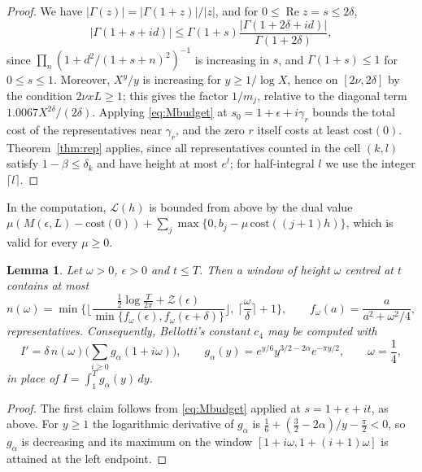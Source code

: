 \documentclass[11pt]{amsart}
\numberwithin{equation}{section}
\newtheorem{lemma}[theorem]{Lemma}
\theoremstyle{definition}
\theoremstyle{remark}
\newcommand{\Rp}{\operatorname{Re}}
\begin{document}
\begin{proof}
We have $|\Gamma(z)| = |\Gamma(1 + z)|/|z|$, and for $0 \leq \Rp z = s \leq 2\delta$,
\[
|\Gamma(1 + s + id)| \leq \Gamma(1 + s)\frac{|\Gamma(1 + 2\delta + id)|}{\Gamma(1 + 2\delta)},
\]
since $\prod_n(1 + d^2/(1 + s + n)^2)^{-1}$ is increasing in $s$, and $\Gamma(1 + s) \leq 1$ for $0 \leq s \leq 1$.
Moreover, $X^y/y$ is increasing for $y \geq 1/\log X$, hence on $[2\nu, 2\delta]$ by the condition $2\nu xL \geq 1$; this gives the factor $1/m_j$, relative to the diagonal term $1.0067X^{2\delta}/(2\delta)$.
Applying \eqref{eq:Mbudget} at $s_0 = 1 + \epsilon + i\gamma_r$ bounds the total cost of the representatives near $\gamma_r$, and the zero $r$ itself costs at least $\mathrm{cost}(0)$.
Theorem~\ref{thm:rep} applies, since all representatives counted in the cell $(k, l)$ satisfy $1 - \beta \leq \delta_k$ and have height at most $e^l$; for half-integral $l$ we use the integer $\lceil l\rceil$.
\end{proof}

In the computation, $\mathcal L(h)$ is bounded from above by the dual value $\mu(M(\epsilon, L) - \mathrm{cost}(0)) + \sum_j\max\{0, b_j - \mu\,\mathrm{cost}((j+1)h)\}$, which is valid for every $\mu \geq 0$.

\begin{lemma}\label{lem:crowd}
Let $\omega > 0$, $\epsilon > 0$ and $t \leq T$.
Then a window of height $\omega$ centred at $t$ contains at most
\[
n(\omega) = \min\Big\{\Big\lfloor\frac{\frac12\log\frac T{2\pi} + \mathcal Z(\epsilon)}{\min\{f_\omega(\epsilon), f_\omega(\epsilon + \delta)\}}\Big\rfloor,\ \Big\lceil\frac\omega\delta\Big\rceil + 1\Big\}, \qquad f_\omega(a) = \frac{a}{a^2 + \omega^2/4},
\]
representatives.
Consequently, Bellotti's constant $c_4$ \cite[(4.13)--(4.14)]{Bellotti} may be computed with
\[
I' = \delta\,n(\omega)\Big(\sum_{i\geq0}g_\alpha(1 + i\omega)\Big), \qquad g_\alpha(y) = e^{y/6}y^{3/2 - 2\alpha}e^{-\pi y/2}, \qquad \omega = \frac14,
\]
in place of $I = \int_1^Tg_\alpha(y)\,dy$.
\end{lemma}

\begin{proof}
The first claim follows from \eqref{eq:Mbudget} applied at $s = 1 + \epsilon + it$, as above.
For $y \geq 1$ the logarithmic derivative of $g_\alpha$ is $\frac16 + (\frac32 - 2\alpha)/y - \frac\pi2 < 0$, so $g_\alpha$ is decreasing and its maximum on the window $[1 + i\omega, 1 + (i+1)\omega]$ is attained at the left endpoint.
\end{proof}
\end{document}
